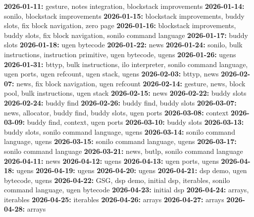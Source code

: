 {\noindent \bf 2026-01-11:} gesture, notes integration, blockstack improvements\smallskip
{\noindent \bf 2026-01-14:} sonilo, blockstack improvements\smallskip
{\noindent \bf 2026-01-15:} blockstack improvements, buddy slots, fix block navigation, zero page\smallskip
{\noindent \bf 2026-01-16:} blockstack improvements, buddy slots, fix block navigation, sonilo command language\smallskip
{\noindent \bf 2026-01-17:} buddy slots\smallskip
{\noindent \bf 2026-01-18:} ugen bytecode\smallskip
{\noindent \bf 2026-01-22:} news\smallskip
{\noindent \bf 2026-01-24:} sonilo, bulk instructions, instruction primitive, ugen bytecode, ugens\smallskip
{\noindent \bf 2026-01-26:} ugens\smallskip
{\noindent \bf 2026-01-31:} bttyp, bulk instructions, ilo interpreter, sonilo command language, ugen ports, ugen refcount, ugen stack, ugens\smallskip
{\noindent \bf 2026-02-03:} bttyp, news\smallskip
{\noindent \bf 2026-02-07:} news, fix block navigation, ugen refcount\smallskip
{\noindent \bf 2026-02-14:} gesture, news, block pool, bulk instructions, ugen stack\smallskip
{\noindent \bf 2026-02-15:} news\smallskip
{\noindent \bf 2026-02-22:} buddy slots\smallskip
{\noindent \bf 2026-02-24:} buddy find\smallskip
{\noindent \bf 2026-02-26:} buddy find, buddy slots\smallskip
{\noindent \bf 2026-03-07:} news, allocator, buddy find, buddy slots, ugen ports\smallskip
{\noindent \bf 2026-03-08:} context\smallskip
{\noindent \bf 2026-03-09:} buddy find, context, ugen ports\smallskip
{\noindent \bf 2026-03-10:} buddy slots\smallskip
{\noindent \bf 2026-03-13:} buddy slots, sonilo command language, ugens\smallskip
{\noindent \bf 2026-03-14:} sonilo command language, ugens\smallskip
{\noindent \bf 2026-03-15:} sonilo command language, ugens\smallskip
{\noindent \bf 2026-03-17:} sonilo command language\smallskip
{\noindent \bf 2026-03-21:} news, butlp, sonilo command language\smallskip
{\noindent \bf 2026-04-11:} news\smallskip
{\noindent \bf 2026-04-12:} ugens\smallskip
{\noindent \bf 2026-04-13:} ugen ports, ugens\smallskip
{\noindent \bf 2026-04-18:} ugens\smallskip
{\noindent \bf 2026-04-19:} ugens\smallskip
{\noindent \bf 2026-04-20:} ugens\smallskip
{\noindent \bf 2026-04-21:} dsp demo, ugen bytecode, ugens\smallskip
{\noindent \bf 2026-04-22:} GSG, dsp demo, initial dsp, iterables, sonilo command language, ugen bytecode\smallskip
{\noindent \bf 2026-04-23:} initial dsp\smallskip
{\noindent \bf 2026-04-24:} arrays, iterables\smallskip
{\noindent \bf 2026-04-25:} iterables\smallskip
{\noindent \bf 2026-04-26:} arrays\smallskip
{\noindent \bf 2026-04-27:} arrays\smallskip
{\noindent \bf 2026-04-28:} arrays\smallskip
